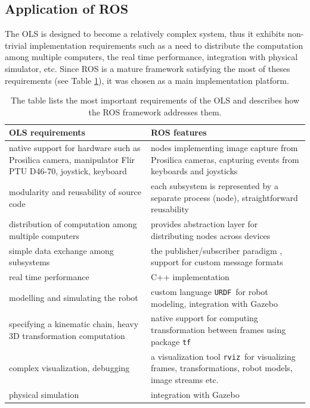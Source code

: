 \subsection{Application of ROS}

The OLS is designed to become a relatively complex system, thus it exhibits non-trivial implementation requirements such as a need to distribute the computation among multiple computers, the real time performance, integration with physical simulator, etc. Since ROS is a mature framework satisfying the most of theses requirements (see Table \ref{tab:ols_requirements_ros_features}), it was chosen as a main implementation platform.


{\renewcommand{\arraystretch}{1.5}
	\begin{table}[htbp]
		\centering
		\caption{The table lists the most important requirements of the OLS and describes how the ROS framework addresses them.}
		\begin{tabularx}{0.99\textwidth}{XX}
			\toprule
			\textbf{OLS requirements} & \textbf{ROS features} \\
			\midrule
			native support for hardware such as Prosilica camera, manipulator Flir PTU D46-70, joystick, keyboard & nodes implementing image capture from Prosilica cameras, capturing events from keyboards and joysticks \\
			modularity and reusability of source code & each subsystem is represented by a separate process (node), straightforward reusability \\
			distribution of computation among multiple computers & provides abstraction layer for distributing nodes across devices \\
			simple data exchange among subsystems & the publisher/subscriber paradigm \cite{O'Kane201310}, support for custom message formats \\
			real time performance & C++ implementation \\
			modelling and simulating the robot & custom language \texttt{URDF}\footnotemark ~for robot modeling, integration with Gazebo \\
			specifying a kinematic chain, heavy 3D transformation computation & native support for computing transformation between frames using package \texttt{tf} \\
			complex visualization, debugging & a visualization tool \texttt{rviz}\footnotemark ~for visualizing frames, transformations, robot models, image streams etc. \\
			physical simulation & integration with Gazebo \\
			\bottomrule
		\end{tabularx}
		\label{tab:ols_requirements_ros_features}
	\end{table}}
	
